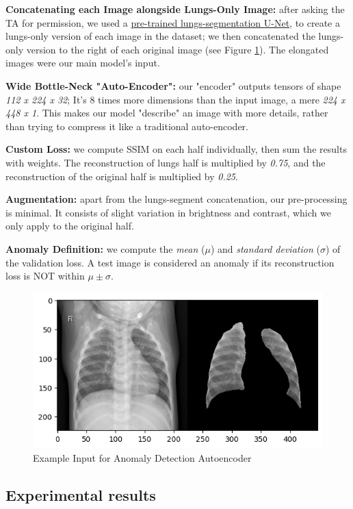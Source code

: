 \documentclass{article}
\begin{document}
\textbf{Concatenating each Image alongside Lungs-Only Image:} after asking the TA for permission, we used a \href{https://www.kaggle.com/datasets/farhanhaikhan/unet-lung-segmentation-weights-for-chest-x-rays/data}{pre-trained lungs-segmentation U-Net}, to create a lungs-only version of each image in the dataset; we then concatenated the lungs-only version to the right of each original image (see Figure \ref {fig:concatenated-lungs-segmentation}). The elongated images were our main model's input.

\textbf{Wide Bottle-Neck "Auto-Encoder":} our "encoder" outputs tensors of shape \textit{112 x 224 x 32}; It's 8 times more dimensions than the input image, a mere \textit{224 x 448 x 1}. This makes our model "describe" an image with more details, rather than trying to compress it like a traditional auto-encoder.

\textbf{Custom Loss:} we compute SSIM on each half individually, then sum the results with weights. The reconstruction of lungs half is multiplied by \textit{0.75}, and the reconstruction of the original half is multiplied by \textit{0.25}.

\textbf{Augmentation:} apart from the lungs-segment concatenation, our pre-processing is minimal. It consists of slight variation in brightness and contrast, which we only apply to the original half.

\textbf{Anomaly Definition:} we compute the \textit{mean} ($\mu$) and \textit{standard deviation} ($\sigma$) of the validation loss. A test image is considered an anomaly if its reconstruction loss is NOT within $\mu\pm\sigma$.

\begin{figure}[H]
  \centering
  \includegraphics[width=0.5\linewidth]{concatenated-lungs-segmentation.png}
  \caption{Example Input for Anomaly Detection Autoencoder}
  \label{fig:concatenated-lungs-segmentation}
\end{figure}

\subsection{Experimental results}
\end{document}
